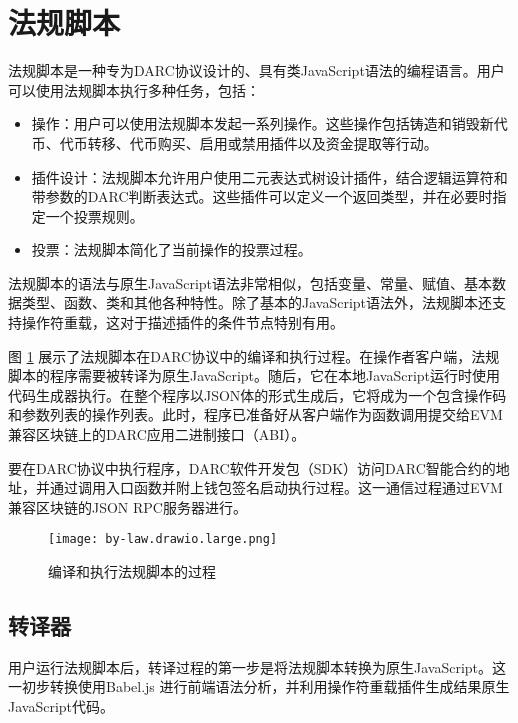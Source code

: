 \documentclass[main.tex]{subfiles}
\begin{document}
\section{法规脚本}

法规脚本是一种专为DARC协议设计的、具有类JavaScript语法的编程语言。用户可以使用法规脚本执行多种任务，包括：

\begin{itemize}
    \item 操作：用户可以使用法规脚本发起一系列操作。这些操作包括铸造和销毁新代币、代币转移、代币购买、启用或禁用插件以及资金提取等行动。

    \item 插件设计：法规脚本允许用户使用二元表达式树设计插件，结合逻辑运算符和带参数的DARC判断表达式。这些插件可以定义一个返回类型，并在必要时指定一个投票规则。

    \item 投票：法规脚本简化了当前操作的投票过程。
\end{itemize}

法规脚本的语法与原生JavaScript语法非常相似，包括变量、常量、赋值、基本数据类型、函数、类和其他各种特性。除了基本的JavaScript语法外，法规脚本还支持操作符重载，这对于描述插件的条件节点特别有用。

图 \ref{fig:byLaw} 展示了法规脚本在DARC协议中的编译和执行过程。在操作者客户端，法规脚本的程序需要被转译为原生JavaScript。随后，它在本地JavaScript运行时使用代码生成器执行。在整个程序以JSON体的形式生成后，它将成为一个包含操作码和参数列表的操作列表。此时，程序已准备好从客户端作为函数调用提交给EVM兼容区块链上的DARC应用二进制接口（ABI）。

要在DARC协议中执行程序，DARC软件开发包（SDK）访问DARC智能合约的地址，并通过调用入口函数并附上钱包签名启动执行过程。这一通信过程通过EVM兼容区块链的JSON RPC服务器进行。

\begin{figure}
\centering
\texttt{[image: by-law.drawio.large.png]}
\caption{\label{fig:byLaw}编译和执行法规脚本的过程}
\end{figure}


\subsection{转译器}

用户运行法规脚本后，转译过程的第一步是将法规脚本转换为原生JavaScript。这一初步转换使用Babel.js \cite{githubGitHubBabelbabel} 进行前端语法分析，并利用操作符重载插件生成结果原生JavaScript代码。
\end{document}
